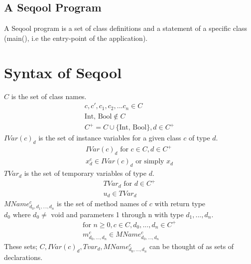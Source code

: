 \documentclass[]{article}
\begin{document}
\subsection{A Seqool Program}
A Seqool program is a set of class definitions and a statement of a specific class (main(), i.e the entry-point of the application).
\section{Syntax of Seqool}
$C$ is the set of class names.
\large
\begin{eqnarray*}
	\label{C - Class names}
	c,c',c_1,c_2,...c_n \in C \\
	\mbox{Int, Bool} \not\in C \\
	C^+ = C \cup \{\mbox{Int, Bool}\}, d \in C^+
\end{eqnarray*}
$IVar(c)_d$ is the set of instance variables for a given class $c$ of type $d$. 
\begin{eqnarray*}
	\label{IVar - Instance Variables}
	IVar(c)_d \mbox{ for } c \in C, d \in C^+\\
	x^{c}_{d}\in IVar(c)_d \mbox{ or simply } x_d
\end{eqnarray*}
$TVar_d$ is the set of temporary variables of type $d$.
\begin{eqnarray*}
	\label{Tvar - Temporary Variables}
	TVar_d \mbox{ for } d \in C^+ \\
	u_d \in TVar_d
\end{eqnarray*}
$MName^{c}_{d_0,d_1,...,d_n}$ is the set of method names of $c$ with return type $d_0 \mbox{ where } d_0 \neq \mbox{ void}$ and parameters 1 through n with type $d_1,...,d_n$.
\begin{eqnarray*}
	\label{Mname - Method Names}
	\mbox{for } n \geq 0, c \in C, d_0,...,d_n \in C^+ \\
	m^{c}_{d_0,...,d_n} \in MName^{c}_{d_0,...,d_n}
\end{eqnarray*}
These sets; $C, IVar(c)_d, Tvar_d, MName^{c}_{d_0,...,d_n}$ can be thought of as sets of declarations.
\normalsize


\end{document}
